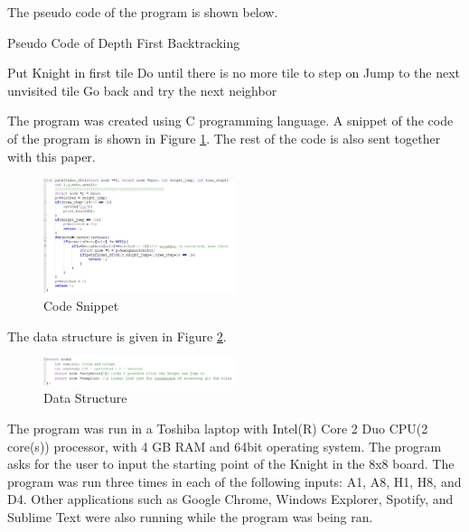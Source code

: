 	 The pseudo code of the program is shown below.\\
	 
	 \begin{algorithm}
\caption{Pseudo Code of Depth First Backtracking}
\begin{algorithmic} 
\STATE Put Knight in first tile
\STATE Do until there is no more tile to step on
\STATE Jump to the next unvisited tile
\STATE Go back and try the next neighbor
\ENDWHILE
\end{algorithmic}
\end{algorithm}


	The program was created using C programming language.  A snippet of the code of the program is shown in Figure \ref{fig:code}. The rest of the code is also sent together with this paper.
	\begin{figure}[h]
 	 \centering
   \includegraphics[width=0.5\textwidth]{code.jpg}
  	\caption{Code Snippet}
 	 \label{fig:code}
	\end{figure}
	
	The data structure is given in Figure \ref{fig:datastr}.
	
	\begin{figure}[h]
 	 \centering
   \includegraphics[width=0.5\textwidth]{datastruct.jpg}
  	\caption{Data Structure}
 	 \label{fig:datastr}
	\end{figure}

	The program was run in a Toshiba laptop with Intel(R) Core 2 Duo CPU(2 core(s)) processor, with 4 GB RAM and 64bit operating system.  The program asks for the user to input the starting point of the Knight in the 8x8 board.  The program was run three times in each of the following inputs: A1, A8, H1, H8, and D4.  Other applications such as Google Chrome, Windows Explorer, Spotify, and Sublime Text were also running while the program was being ran.\\
	
